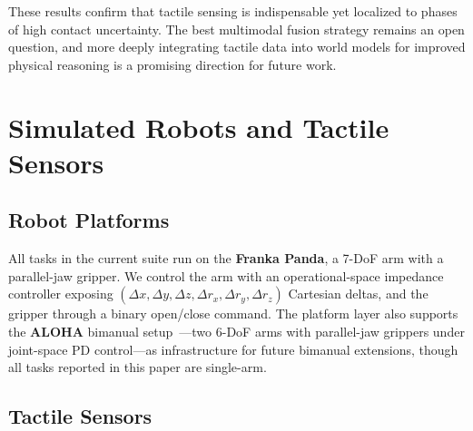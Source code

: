 \documentclass{article}
\begin{document}
These results confirm that tactile sensing is indispensable yet localized to phases of high contact uncertainty. The best multimodal fusion strategy remains an open question, and more deeply integrating tactile data into world models for improved physical reasoning is a promising direction for future work.



\clearpage



\appendix
\section{Simulated Robots and Tactile Sensors}
\label{app:robots-sensors}


\subsection{Robot Platforms}

All tasks in the current suite run on the \textbf{Franka Panda}, a 7-DoF arm with a parallel-jaw gripper. We control the arm with an operational-space impedance controller exposing $(\Delta x, \Delta y, \Delta z, \Delta r_x, \Delta r_y, \Delta r_z)$ Cartesian deltas, and the gripper through a binary open/close command. The platform layer also supports the \textbf{ALOHA} bimanual setup~\citep{aloha2023}---two 6-DoF arms with parallel-jaw grippers under joint-space PD control---as infrastructure for future bimanual extensions, though all tasks reported in this paper are single-arm.

\subsection{Tactile Sensors}
\end{document}
